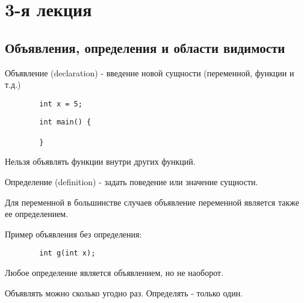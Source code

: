 \section{3-я лекция}

\subsection{Объявления, определения и области видимости}

\begin{definition}
	Объявление (declaration) - введение новой сущности (переменной, функции и т.д.)
\end{definition}

\begin{example}
	\begin{verbatim}
		int x = 5;
	\end{verbatim}
	
	\begin{verbatim}
		int main() {
			
		}
	\end{verbatim}
\end{example}

\begin{note}
	Нельзя объявлять функции внутри других функций.
\end{note}

\begin{definition}
	Определение (definition) - задать поведение или значение сущности.
\end{definition}

\begin{note}
	Для переменной в большинстве случаев объявление переменной является также ее определением. 
\end{note}

\begin{example}
	Пример объявления без определения:
	
	\begin{verbatim}
		int g(int x);
	\end{verbatim}
\end{example}

\begin{note}
	Любое определение является объявлением, но не наоборот.
\end{note}

\begin{note}
	Объявлять можно сколько угодно раз. Определять - только один.
\end{note}

